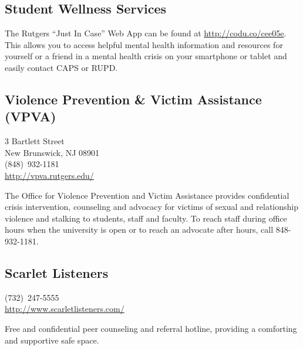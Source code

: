 \documentclass{article}
\begin{document}
\subsection*{Student Wellness Services}
The Rutgers “Just In Case” Web App can be found at \href{http://codu.co/cee05e}{http://codu.co/cee05e}. This allows you to access helpful mental health information and resources for yourself or a friend in a mental health crisis on your smartphone or tablet and easily contact CAPS or RUPD.

\subsection*{Violence Prevention \& Victim Assistance (VPVA)}
3 Bartlett Street \\
New Brunswick, NJ 08901 \\
(848)~932-1181 \\
\href{http://vpva.rutgers.edu/}{http://vpva.rutgers.edu/} 
\par
\hfill \par 
\noindent The Office for Violence Prevention and Victim Assistance provides confidential crisis intervention, counseling and advocacy for victims of sexual and relationship violence and stalking to students, staff and faculty. To reach staff during office hours when the university is open or to reach an advocate after hours, call 848-932-1181.


\subsection*{Scarlet Listeners}
(732)~247-5555\\
\href{http://www.scarletlisteners.com/}{http://www.scarletlisteners.com/} \par \hfill \par
\noindent Free and confidential peer counseling and referral hotline, providing a comforting and supportive safe space.
\end{document}
